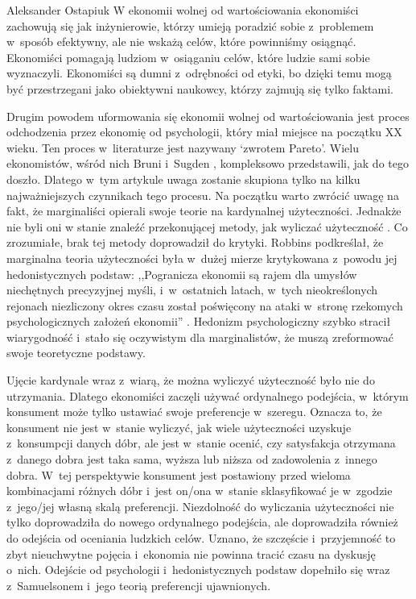 \begin{artplenv}{Aleksander Ostapiuk}
W ekonomii wolnej od wartościowania ekonomiści zachowują się jak inżynierowie, którzy umieją poradzić sobie z~problemem
w~sposób efektywny, ale nie wskażą celów, które powinniśmy osiągnąć. Ekonomiści pomagają ludziom w~osiąganiu celów,
które ludzie sami sobie wyznaczyli. Ekonomiści są dumni z~odrębności od etyki, bo dzięki temu mogą być przestrzegani
jako obiektywni naukowcy, którzy zajmują się tylko faktami. 

Drugim powodem uformowania się ekonomii wolnej od wartościowania jest proces odchodzenia przez ekonomię od psychologii,
który miał miejsce na początku XX wieku. Ten proces w~literaturze jest nazywany `zwrotem Pareto'. Wielu ekonomistów,
wśród nich Bruni i~Sugden
\parencite*{bruni_road_2007},
kompleksowo przedstawili, jak do tego doszło. Dlatego w~tym
artykule uwaga zostanie skupiona tylko na kilku najważniejszych czynnikach tego procesu. Na początku warto zwrócić
uwagę na fakt, że marginaliści opierali swoje teorie na kardynalnej użyteczności. Jednakże nie byli oni w
stanie znaleźć przekonującej metody, jak wyliczać użyteczność
\parencite{stigler_development_1950}.
Co zrozumiałe,
brak tej metody doprowadził do krytyki. Robbins podkreślał, że marginalna teoria użyteczności była w~dużej mierze
krytykowana z~powodu jej hedonistycznych podstaw: ,,Pogranicza ekonomii są rajem dla umysłów niechętnych precyzyjnej
myśli, i~w~ostatnich latach, w~tych nieokreślonych rejonach niezliczony okres czasu został poświęcony na ataki w~stronę
rzekomych psychologicznych założeń ekonomii''
\parencite[s.~83]{robbins_essay_1935}.
Hedonizm psychologiczny
szybko stracił wiarygodność i~stało się oczywistym dla marginalistów, że muszą zreformować swoje teoretyczne podstawy. 

Ujęcie kardynale wraz z~wiarą, że można wyliczyć użyteczność było nie do utrzymania. Dlatego ekonomiści zaczęli używać
ordynalnego podejścia, w~którym konsument może tylko ustawiać swoje preferencje w~szeregu. Oznacza to, że konsument nie
jest w~stanie wyliczyć, jak wiele użyteczności uzyskuje z~konsumpcji danych dóbr, ale jest w~stanie ocenić, czy
satysfakcja otrzymana z~danego dobra jest taka sama, wyższa lub niższa od zadowolenia z~innego dobra. W~tej
perspektywie konsument jest postawiony przed wieloma kombinacjami różnych dóbr i~jest on/ona w~stanie sklasyfikować je
w~zgodzie z~jego/jej własną skalą preferencji. Niezdolność do wyliczania użyteczności nie tylko doprowadziła do nowego
ordynalnego podejścia, ale doprowadziła również do odejścia od oceniania ludzkich celów. Uznano, że
szczęście i~przyjemność to zbyt nieuchwytne pojęcia i~ekonomia nie powinna tracić czasu na dyskusję o~nich.
Odejście od psychologii i~hedonistycznych podstaw dopełniło się wraz z~Samuelsonem i~jego teorią preferencji ujawnionych. 


\end{artplenv}
